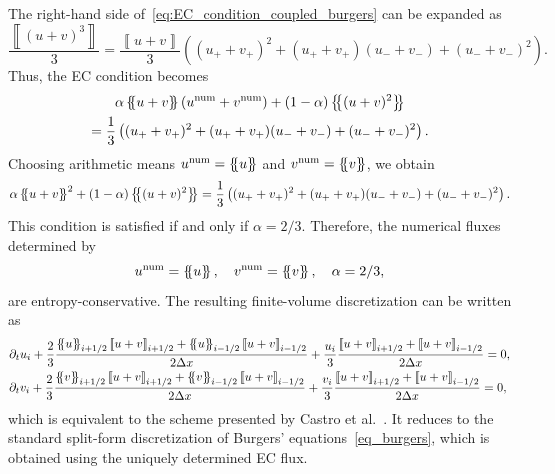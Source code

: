 \documentclass[]{scrartcl}
\newcommand*{\ldblbrace}{\{\mskip-5mu \left \{}
\newcommand*{\rdblbrace}{ \}\mskip-5mu \right \}}
\newcommand{\mean}[1]{\left\ldblbrace #1 \right\rdblbrace}
\newcommand{\jump}[1]{\left\llbracket #1  \right\rrbracket}
\theoremstyle{definition}
\begin{document}
The right-hand side of~\eqref{eq:EC_condition_coupled_burgers} can be expanded as
\begin{equation}
\frac{\jump{(u+v)^3}}{3} = \frac{\jump{u+v}}{3} \left((u_+ + v_+)^2 + (u_+ + v_+)(u_- + v_-) + (u_-+v_-)^2\right).
\end{equation}
Thus, the EC condition becomes
\begin{multline}
    \alpha \mean{u+v} \left( u^{\mathrm{num}} + v^{\mathrm{num}} \right) + (1-\alpha) \mean{(u+v)^2}
    \\
    = \frac{1}{3}\left((u_+ + v_+)^2 + (u_+ + v_+)(u_- + v_-) + (u_-+v_-)^2\right).
\end{multline}
Choosing arithmetic means $u^{\mathrm{num}} = \mean{u}$ and $v^{\mathrm{num}} = \mean{v}$, we obtain
\begin{equation}
    \alpha \mean{u+v}^2 + (1-\alpha) \mean{(u+v)^2}
    = \frac{1}{3}\left((u_+ + v_+)^2 + (u_+ + v_+)(u_- + v_-) + (u_-+v_-)^2\right).
\end{equation}
This condition is satisfied if and only if $\alpha = 2/3$.
Therefore, the numerical fluxes determined by
\begin{equation}
    u^{\mathrm{num}} = \mean{u}, \quad
    v^{\mathrm{num}} = \mean{v}, \quad
    \alpha = 2/3,
\end{equation}
are entropy-conservative. The resulting finite-volume discretization can be written as
\begin{equation}
\begin{aligned}
    &\partial_t u_i
    + \frac{2}{3}\frac{\mean{u}_{i+1/2}\jump{u+v}_{i+1/2} + \mean{u}_{i-1/2}\jump{u+v}_{i-1/2}}{2 \Delta x}
    + \frac{u_i}{3}\frac{\jump{u+v}_{i+1/2} + \jump{u+v}_{i-1/2}}{2\Delta x}
    = 0,
    \\
    & \partial_t v_i
    + \frac{2}{3}\frac{\mean{v}_{i+1/2}\jump{u+v}_{i+1/2} + \mean{v}_{i-1/2}\jump{u+v}_{i-1/2}}{2 \Delta x}
    + \frac{v_i}{3}\frac{\jump{u+v}_{i+1/2} + \jump{u+v}_{i-1/2}}{2 \Delta x}
    = 0,
\end{aligned}
\end{equation}
which is equivalent to the scheme presented by Castro et al.~\cite{Castro2013}.
It reduces to the standard split-form discretization of Burgers' equations~\eqref{eq_burgers}, which is obtained using the uniquely determined EC flux.
\end{document}
